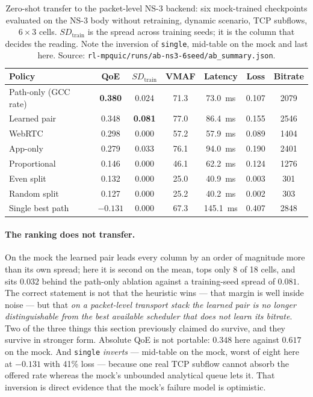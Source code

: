 \begin{table}[t]
  \centering
  \caption[Zero-shot transfer to the packet-level NS-3 backend]{Zero-shot transfer to the packet-level NS-3 backend: six mock-trained checkpoints evaluated
  on the NS-3 body without retraining, dynamic scenario, TCP subflows, $6 \times 3$ cells.
  $\mathit{SD}_{\mathrm{train}}$ is the spread across training seeds; it is the column that decides the
  reading. Note the inversion of \texttt{single}, mid-table on the mock and last here. Source:
  \texttt{rl-mpquic/runs/ab-ns3-6seed/ab\_summary.json}.}
  \label{tab:p2ns3}
  \begin{tabular}{lcccccc}
    \toprule
    Policy & QoE & $\mathit{SD}_{\mathrm{train}}$ & VMAF & Latency & Loss & Bitrate \\
    \midrule
    Path-only (GCC rate) & \textbf{0.380} & 0.024 & 71.3 & \SI{73.0}{\milli\second}  & 0.107 & 2079 \\
    Learned pair         & 0.348 & \textbf{0.081} & 77.0 & \SI{86.4}{\milli\second}  & 0.155 & 2546 \\
    WebRTC               & 0.298 & 0.000 & 57.2 & \SI{57.9}{\milli\second}  & 0.089 & 1404 \\
    App-only             & 0.279 & 0.033 & 76.1 & \SI{94.0}{\milli\second}  & 0.190 & 2401 \\
    Proportional         & 0.146 & 0.000 & 46.1 & \SI{62.2}{\milli\second}  & 0.124 & 1276 \\
    Even split           & 0.132 & 0.000 & 25.0 & \SI{40.9}{\milli\second}  & 0.003 & 301 \\
    Random split         & 0.127 & 0.000 & 25.2 & \SI{40.2}{\milli\second}  & 0.002 & 303 \\
    Single best path     & $-0.131$ & 0.000 & 67.3 & \SI{145.1}{\milli\second} & 0.407 & 2848 \\
    \bottomrule
  \end{tabular}
\end{table}

\paragraph{The ranking does not transfer.} On the mock the learned pair leads every column by an order
of magnitude more than its own spread; here it is second on the mean, tops only 8 of 18 cells, and sits
$0.032$ behind the path-only ablation against a training-seed spread of $0.081$. The correct statement
is not that the heuristic wins --- that margin is well inside noise --- but that \emph{on a packet-level
transport stack the learned pair is no longer distinguishable from the best available scheduler that
does not learn its bitrate}. Two of the three things this section previously claimed do survive, and
they survive in stronger form. Absolute QoE is not portable: $0.348$ here against $0.617$ on the mock.
And \texttt{single} \emph{inverts} --- mid-table on the mock, worst of eight here at $-0.131$ with 41\%
loss --- because one real TCP subflow cannot absorb the offered rate whereas the mock's unbounded
analytical queue lets it. That inversion is direct evidence that the mock's failure model is optimistic.

